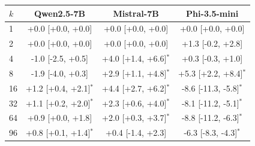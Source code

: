 \begin{tabular}{lccc}
\toprule
$k$ & Qwen2.5-7B & Mistral-7B & Phi-3.5-mini \\
\midrule
1 & +0.0 [+0.0, +0.0] & +0.0 [+0.0, +0.0] & +0.0 [+0.0, +0.0] \\
2 & +0.0 [+0.0, +0.0] & +0.0 [+0.0, +0.0] & +1.3 [-0.2, +2.8] \\
4 & -1.0 [-2.5, +0.5] & +4.0 [+1.4, +6.6]$^{*}$ & +0.3 [-0.3, +1.0] \\
8 & -1.9 [-4.0, +0.3] & +2.9 [+1.1, +4.8]$^{*}$ & +5.3 [+2.2, +8.4]$^{*}$ \\
16 & +1.2 [+0.4, +2.1]$^{*}$ & +4.4 [+2.7, +6.2]$^{*}$ & -8.6 [-11.3, -5.8]$^{*}$ \\
32 & +1.1 [+0.2, +2.0]$^{*}$ & +2.3 [+0.6, +4.0]$^{*}$ & -8.1 [-11.2, -5.1]$^{*}$ \\
64 & +0.9 [+0.0, +1.8] & +2.0 [+0.3, +3.7]$^{*}$ & -8.8 [-11.2, -6.3]$^{*}$ \\
96 & +0.8 [+0.1, +1.4]$^{*}$ & +0.4 [-1.4, +2.3] & -6.3 [-8.3, -4.3]$^{*}$ \\
\bottomrule
\end{tabular}
